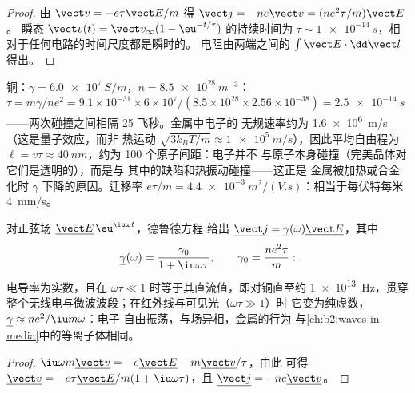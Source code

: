 \begin{proof}
由 $\vect v = -e\tau\vect E/m$ 得 $\vect j = -ne\vect v = (ne^2\tau/m)\vect E$。
瞬态 $\vect v(t) = \vect v_\infty(1 - \eu^{-t/\tau})$ 的持续时间为 $\tau \sim
\qty{1e-14}{s}$，相对于任何电路的时间尺度都是瞬时的。
电阻由两端之间的 $\int\vect E\cdot\dd\vect l$ 得出。
\end{proof}

\begin{example}[铜，由实测电导率求得]\label{ex:b2:charges-currents-conduction:copper}
铜：$\gamma = \qty{6.0e7}{S/m}$，$n = \qty{8.5e28}{m^{-3}}$：$\tau = m\gamma/ne^2 =
9.1 \times 10^{-31} \times 6 \times 10^7/(8.5 \times 10^{28} \times 2.56 \times 10^{-38}) = \qty{2.5e-14}{s}$
——两次碰撞之间相隔 25 飞秒。金属中电子的
无规速率约为 \qty{1.6e6}{m/s}（这是量子效应，而非
热运动 $\sqrt{3k_BT/m} \approx \qty{1e5}{m/s}$），因此平均自由程为 $\ell
= v\tau \approx \qty{40}{nm}$，约为 100 个原子间距：电子并不
与原子本身碰撞（完美晶体对它们是透明的），而是与
其中的缺陷和热振动碰撞——这正是
金属被加热或合金化时 $\gamma$ 下降的原因。迁移率 $e\tau/m =
\qty{4.4e-3}{m^2/(V.s)}$：相当于每伏特每米 \qty{4}{mm/s}。
\end{example}

\begin{proposition}[高频下的欧姆定律]\label{prop:b2:charges-currents-conduction:acdrude}
对正弦场 $\underline{\vect E}\,\eu^{\iu\omega t}$，德鲁德方程
给出 $\underline{\vect j} = \underline\gamma(\omega)\underline{\vect E}$，其中
\[
\underline\gamma(\omega) = \frac{\gamma_0}{1 + \iu\omega\tau} , \qquad \gamma_0 = \frac{ne^2\tau}{m} :
\]
电导率为实数，且在 $\omega\tau
\ll 1$ 时等于其直流值，即对铜直至约 \qty{1e13}{Hz}，贯穿
整个无线电与微波波段；在红外线与可见光（$\omega\tau \gg 1$）时
它变为纯虚数，$\underline\gamma \approx ne^2/\iu m\omega$：电子
自由振荡，与场异相，金属的行为
与\cref{ch:b2:waves-in-media}中的等离子体相同。
\end{proposition}

\begin{proof}
$\iu\omega m\underline{\vect v} = -e\underline{\vect E} - m\underline{\vect v}/\tau$，由此
可得 $\underline{\vect v} = -e\tau\underline{\vect E}/m(1 + \iu\omega\tau)$，且 $\underline{\vect j}
= -ne\underline{\vect v}$。
\end{proof}

